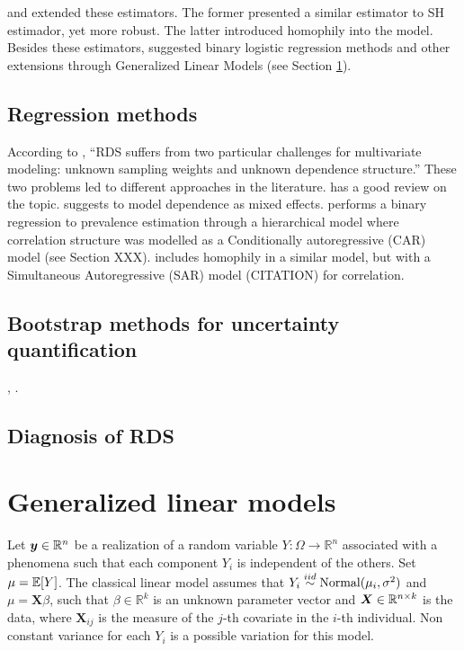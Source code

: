 \textcite{ott2019reduced} and \textcite{fellows2019respondent} extended these
estimators. The former presented
a similar estimator to SH estimador, yet more robust. The latter introduced
homophily into the model. Besides these estimators,
\textcite{avery2021statistical} suggested binary logistic
regression methods and other extensions through Generalized Linear Models (see
Section \ref{sec:glm}). 

\subsection{Regression methods}

According to \textcite[p. 86]{gile2018methods}, ``RDS suffers from two particular challenges for multivariate modeling: unknown sampling weights
and unknown dependence structure.'' These two problems led to different
approaches in the literature. \textcite[p.
13-15]{avery2021statistical} has a good review on the
topic. \textcite{spiller2009regression} suggests to model dependence as mixed
effects. \textcite{bastos2012binary} performs a binary regression to
prevalence estimation through a hierarchical model where correlation structure
was modelled as a Conditionally autoregressive (CAR) model (see Section XXX).
\textcite{yauck2021general} includes homophily in a similar model, but with a
Simultaneous Autoregressive (SAR) model (CITATION) for correlation. 

\subsection{Bootstrap methods for uncertainty quantification}

\cite{baraff2016estimating}, \cite{salganik2006variance}. 

\subsection{Diagnosis of RDS}

\cite{gile2015diagnostics}

\section{Generalized linear models}
\label{sec:glm}

Let $\boldsymbol{y} \in \mathbb{R}^n$ be a realization of a random variable $Y :
\Omega \to \mathbb{R}^n$ associated with a phenomena such that each component
$Y_i$ is independent of the others. Set $\mu = \mathbb{E}[Y]$. The classical linear
model assumes that $Y_i \overset{iid}{\sim} \operatorname{Normal}(\mu_i, \sigma^2)$ and $\mu =
\boldsymbol{X}\beta$, such that $\beta \in \mathbb{R}^k$ is an unknown parameter vector and
$\boldsymbol{X} \in \mathbb{R}^{n \times k}$ is the data, where $\boldsymbol{X}_{ij}$
is the measure of the $j$-th covariate in the $i$-th individual. Non constant
variance for each $Y_i$ is a possible variation for this model. 

